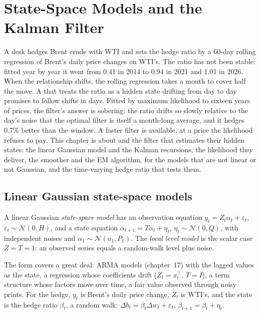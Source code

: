 \chapter{State-Space Models and the Kalman Filter}\label{ch:qm:state-space-models-and-the-kalman-filter}

A desk hedges Brent crude with WTI and sets the hedge ratio by a 60-day rolling regression of Brent's daily price changes on WTI's. The ratio
has not been stable: fitted year by year it went from 0.41 in 2014 to 0.94 in 2021 and 1.01 in 2026. When the relationship shifts, the rolling
regression takes a month to cover half the move. A  that treats the ratio as a hidden state drifting from day to day promises to
follow shifts in days. Fitted by maximum likelihood to sixteen years of prices, the filter's answer is sobering: the ratio drifts so slowly
relative to the day's noise that the optimal filter is itself a month-long average, and it hedges 0.7\% better than the window. A faster filter
is available, at a price the likelihood refuses to pay. This chapter is about  and the filter that estimates their hidden
states: the linear Gaussian model and the Kalman recursions, the likelihood they deliver, the smoother and the EM algorithm,  for
the models that are not linear or not Gaussian, and the time-varying hedge ratio that tests them.

\section{Linear Gaussian state-space models}

\begin{definition}\label{def:qm:state-space-models-and-the-kalman-filter:ssm}
A linear Gaussian \emph{state-space model} has an observation equation $y_t = Z_t\alpha_t + \varepsilon_t$, $\varepsilon_t \sim \mathcal N(0,
H)$, and a state equation $\alpha_{t+1} = T\alpha_t + \eta_t$, $\eta_t \sim \mathcal N(0, Q)$, with independent noises and $\alpha_1 \sim \mathcal N(a_1, P_1)$. The
\emph{local level model} is the scalar case $Z = T = 1$: an observed series equals a random-walk level plus noise.
\end{definition}

The form covers a great deal: ARMA models (chapter~17) with the lagged values as the state, a regression whose coefficients drift ($Z_t = x_t^\top$,
$T = I$), a term structure whose factors move over time, a fair value observed through noisy prints. For the hedge, $y_t$ is Brent's daily price change,
$Z_t$ is WTI's, and the state is the hedge ratio $\beta_t$, a random walk: $\Delta b_t = \beta_t\Delta w_t + \varepsilon_t$, $\beta_{t+1} = \beta_t + \eta_t$.

